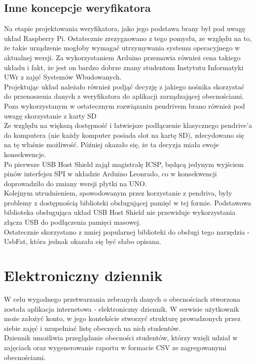 \documentclass[declaration,shortabstract, mgr]{iithesis}
\begin{document}
\subsection{Inne koncepcje weryfikatora}
\indent Na etapie projektowania weryfikatora, jako jego podstawa brany był pod uwagę układ Raspberry Pi. Ostatecznie zrezygnowano z tego pomysłu, ze względu na to, że takie urządzenie mogłoby wymagać utrzymywania systemu operacyjnego w aktualnej wersji. Za wykorzystaniem Arduino przemawia również cena takiego układu i fakt, że jest on bardzo dobrze znany studentom Instytutu Informatyki UWr z zajęć Systemów Wbudowanych.\\
\indent Projektując układ należało również podjąć decyzję z jakiego nośnika skorzystać do przenoszenia danych z weryfikatora do aplikacji zarządzającej obecnościami. Poza wykorzystanym w ostatecznym rozwiązaniu pendrivem brano również pod uwagę skorzystanie z karty SD \\
\indent Ze względu na większą dostępność i łatwiejsze podłączenie klasycznego pendrive'a do komputera (nie każdy komputer posiada slot na kartę SD), zdecydowano się na tę właśnie możliwość. Później okazało się, że ta decyzja miała swoje konsekwencje.\\
\indent Po pierwsze USB Host Shield zajął magistralę ICSP, będącą jedynym wyjściem pinów interfejsu SPI w układzie Arduino Leonrado, co w konsekwencji doprowadziło do zmiany wersji płytki na UNO. \\
\indent Kolejnym utrudnieniem, spowodowanym przez korzystanie z pendriva, były problemy z dostępnością biblioteki obsługującej pamięć w tej formie. Podstawowa biblioteka obsługująca układ USB Host Shield nie przewiduje wykorzystania złącza USB do podłączenia pamięci masowej. \\
\indent Ostatecznie skorzystano z mniej popularnej biblioteki do obsługi tego narzędzia - UsbFat\cite{usbfat}, która jednak okazała się być słabo opisana.

\section{Elektroniczny dziennik}
\indent W celu wygodnego przetwarzania zebranych danych o obecnościach stworzona została aplikacja internetowa - elektroniczny dziennik. W serwisie użytkownik może założyć konto, w jego kontekście stworzyć strukturę prowadzonych przez siebie zajęć i uzupełniać listę obecnych na nich studentów.\\
\indent Dziennik umożliwia przeglądanie obecności studentów, którzy wzięli udział w zajęciach oraz  wygenerowanie raportu w formacie CSV ze zagregowanymi obecnościami.
\end{document}
